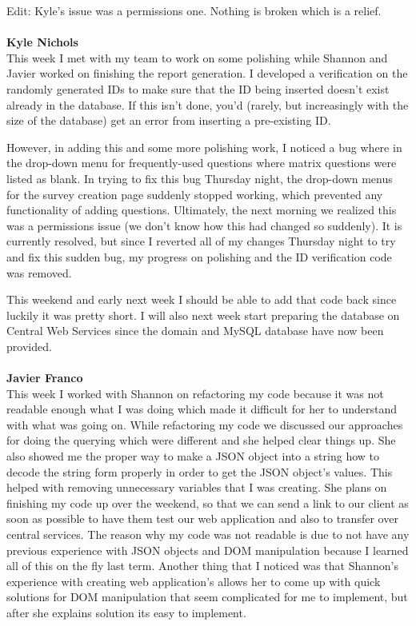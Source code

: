 \documentclass[../final.tex]{subfiles}
\begin{document}
Edit: Kyle's issue was a permissions one. Nothing is broken which is a relief.\\ \\
\textbf{Kyle Nichols}\\
This week I met with my team to work on some polishing while Shannon and Javier worked on finishing the report generation. I developed a verification on the randomly generated IDs to make sure that the ID being inserted doesn't exist already in the database. If this isn't done, you'd (rarely, but increasingly with the size of the database) get an error from inserting a pre-existing ID.

However, in adding this and some more polishing work, I noticed a bug where in the drop-down menu for frequently-used questions where matrix questions were listed as blank. In trying to fix this bug Thursday night, the drop-down menus for the survey creation page suddenly stopped working, which prevented any functionality of adding questions. Ultimately, the next morning we realized this was a permissions issue (we don't know how this had changed so suddenly). It is currently resolved, but since I reverted all of my changes Thursday night to try and fix this sudden bug, my progress on polishing and the ID verification code was removed.

This weekend and early next week I should be able to add that code back since luckily it was pretty short. I will also next week start preparing the database on Central Web Services since the domain and MySQL database have now been provided.\\ \\
\textbf{Javier Franco}\\
This week I worked with Shannon on refactoring my code because it was not readable enough what I was doing which made it difficult for her to understand with what was going on. While refactoring my code we discussed our approaches for doing the querying which were different and she helped clear things up. She also showed me the proper way to make a JSON object into a string how to decode the string form properly in order to get the JSON object's values. This helped with removing unnecessary variables that I was creating. She plans on finishing my code up over the weekend, so that we can send a link to our client as soon as possible to have them test our web application and also to transfer over central services. The reason why my code was not readable is due to not have any previous experience with JSON objects and DOM manipulation because I learned all of this on the fly last term. Another thing that I noticed was that Shannon's experience with creating web application's allows her to come up with quick solutions for DOM manipulation that seem complicated for me to implement, but after she explains solution its easy to implement. \\
\end{document}
